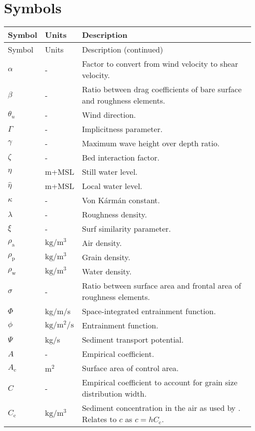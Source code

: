 \chapter*{Symbols}
\label{ch:symbols}

\begin{longtable}{p{1cm} p{2cm} p{7.75cm}}
  Symbol & Units & Description \\
  \hline
  \endfirsthead
  Symbol & Units & Description \hfill (continued)\\
  \hline
  \endhead
  $\alpha$ & - & Factor to convert from wind velocity to shear velocity. \\
  $\beta$ & - & Ratio between drag coefficients of bare surface and roughness elements. \\
  $\theta_u$ & - & Wind direction. \\
  $\Gamma$ & - & Implicitness parameter. \\
  $\gamma$ & - & Maximum wave height over depth ratio. \\
  $\zeta$ & - & Bed interaction factor. \\
  $\eta$ & m+MSL & Still water level. \\
  $\hat{\eta}$ & m+MSL & Local water level. \\
  $\kappa$ & - & Von K{\'a}rm{\'a}n constant. \\
  $\lambda$ & - & Roughness density. \\
  $\xi$ & - & Surf similarity parameter. \\
  $\rho_{\mathrm{a}}$ & $\mathrm{kg/m^3}$ & Air density. \\
  $\rho_{\mathrm{p}}$ & $\mathrm{kg/m^3}$ & Grain density. \\
  $\rho_{\mathrm{w}}$ & $\mathrm{kg/m^3}$ & Water density. \\
  $\sigma$ & - & Ratio between surface area and frontal area of roughness elements. \\
  $\Phi$ & kg/m/s & Space-integrated entrainment function. \\
  $\phi$ & $\mathrm{kg/m^2/s}$ & Entrainment function. \\
  $\Psi$ & kg/s & Sediment transport potential. \\
  $A$ & - & Empirical coefficient. \\
  $A_{\mathrm{c}}$ & $\mathrm{m^2}$ & Surface area of control area. \\
  $C$ & - & Empirical coefficient to account for grain size distribution width. \\
  $C_{\mathrm{c}}$ & $\mathrm{kg/m^3}$ & Sediment concentration in the air as used by \citet{deVries2014a}. Relates to $c$ as $c = h C_{\mathrm{c}}$. \\

\end{longtable}
